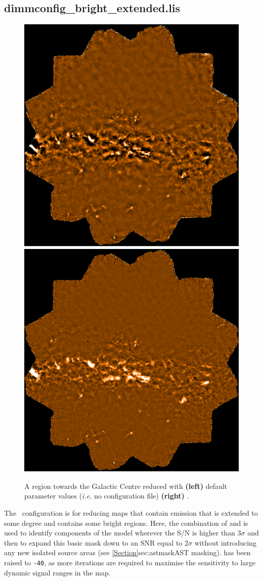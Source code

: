\subsection{dimmconfig\_bright\_extended.lis}

\begin{figure}[t!]
\includegraphics[width=0.47\linewidth]{sc21_gal_def}
\hspace{3mm}
\includegraphics[width=0.47\linewidth]{sc21_gal_brex}
\caption[Example map reduced with
  ]
   {A region towards the Galactic Centre reduced with \textbf{(left)}
   default parameter values (\emph{i.e.} no configuration file) \textbf{(right)}
   .\label{fig:becompare}}
\end{figure}

The \brightextended\ configuration is for reducing maps that contain
emission that is extended to some degree and contains some bright
regions. Here, the combination of  
and  is used to identify components of
the  model wherever the S/N is higher than 3$\sigma$ and then
to expand this basic mask down to an SNR equal to 2$\sigma$ without introducing 
any new isolated source areas (see \cref{Section}{sec:astmask}{AST masking}).
 has been raised to \texttt{-40}, as more iterations are 
required to maximise the sensitivity to large dynamic signal ranges in the map.

